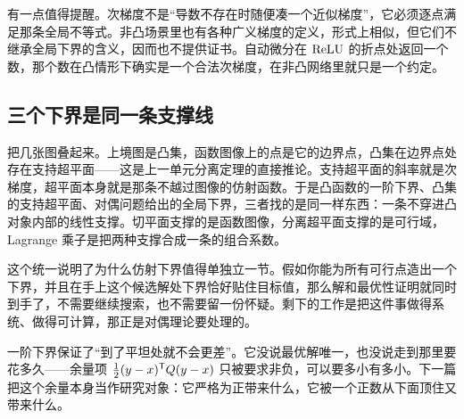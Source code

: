 有一点值得提醒。次梯度不是``导数不存在时随便凑一个近似梯度''，它必须逐点满足那条全局不等式。非凸场景里也有各种广义梯度的定义，形式上相似，但它们不继承全局下界的含义，因而也不提供证书。自动微分在 \(\operatorname{ReLU}\) 的折点处返回一个数，那个数在凸情形下确实是一个合法次梯度，在非凸网络里就只是一个约定。

\subsection{三个下界是同一条支撑线}

把几张图叠起来。上境图是凸集，函数图像上的点是它的边界点，凸集在边界点处存在支持超平面——这是上一单元分离定理的直接推论。支持超平面的斜率就是次梯度，超平面本身就是那条不越过图像的仿射函数。于是凸函数的一阶下界、凸集的支持超平面、对偶问题给出的全局下界，三者找的是同一样东西：一条不穿进凸对象内部的线性支撑。切平面支撑的是函数图像，分离超平面支撑的是可行域，Lagrange 乘子是把两种支撑合成一条的组合系数。

这个统一说明了为什么仿射下界值得单独立一节。假如你能为所有可行点造出一个下界，并且在手上这个候选解处下界恰好贴住目标值，那么解和最优性证明就同时到手了，不需要继续搜索，也不需要留一份怀疑。剩下的工作是把这件事做得系统、做得可计算，那正是对偶理论要处理的。

一阶下界保证了``到了平坦处就不会更差''。它没说最优解唯一，也没说走到那里要花多久——余量项 \(\tfrac12(y-x)^{\mathsf{T}}Q(y-x)\) 只被要求非负，可以要多小有多小。下一篇把这个余量本身当作研究对象：它严格为正带来什么，它被一个正数从下面顶住又带来什么。
